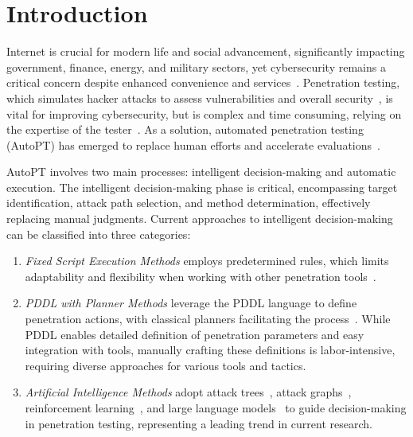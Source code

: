 \section{Introduction}
 Internet is crucial for modern life and social advancement, significantly impacting government, finance, energy, and military sectors, yet cybersecurity remains a critical concern despite enhanced convenience and services~\cite{chen2022research, wani2021sdn, verma2024revisiting}.
Penetration testing, which simulates hacker attacks to assess vulnerabilities and overall security~\cite{abu2018automated, dorchuck2021goal}, is vital for improving cybersecurity, but is complex and time consuming, relying on the expertise of the tester~\cite{applebaum2016intelligent}. As a solution, automated penetration testing (AutoPT) has emerged to replace human efforts and accelerate evaluations~\cite{ghanem2018reinforcement}.

AutoPT involves two main processes: intelligent decision-making and automatic execution. The intelligent decision-making phase is critical, encompassing target identification, attack path selection, and method determination, effectively replacing manual judgments. Current approaches to intelligent decision-making can be classified into three categories:


\begin{enumerate}
    \item \textit{Fixed Script Execution Methods} employs predetermined rules, which limits adaptability and flexibility when working with other penetration tools~\cite{hacks2021towards}.
    \item \textit{PDDL with Planner Methods} leverage the PDDL language to define penetration actions, with classical planners facilitating the process~\cite{applebaum2017analysis,yichao2019improved}. While PDDL enables detailed definition of penetration parameters and easy integration with tools, manually crafting these definitions is labor-intensive, requiring diverse approaches for various tools and tactics.
    \item \textit{Artificial Intelligence Methods} adopt attack trees~\cite{dorchuck2021goal}, attack graphs~\cite{obes2013attack}, reinforcement learning~\cite{hu2020automated,chowdhary2020autonomous}, and large language models~\cite{bianou2024pentest,deng2024pentestgpt} to guide decision-making in penetration testing, representing a leading trend in current research.
\end{enumerate}

